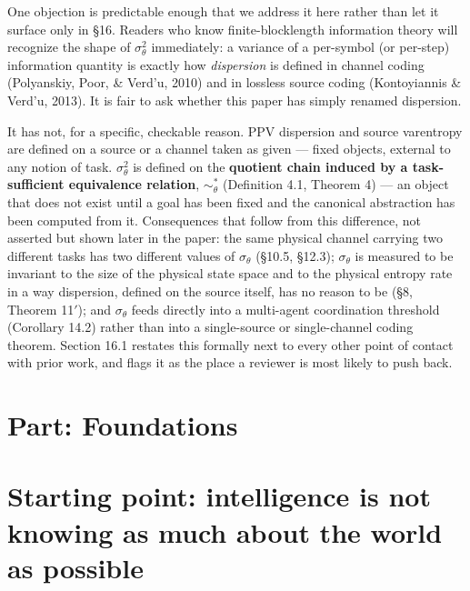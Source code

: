 \documentclass[11pt]{article}
\begin{document}
One objection is predictable enough that we address it here rather than let it surface only in \S{}16. Readers who know finite-blocklength information theory will recognize the shape of \(\sigma_\theta^2\) immediately: a variance of a per-symbol (or per-step) information quantity is exactly how \emph{dispersion} is defined in channel coding (Polyanskiy, Poor, \& Verd'u, 2010) and in lossless source coding (Kontoyiannis \& Verd'u, 2013). It is fair to ask whether this paper has simply renamed dispersion.

It has not, for a specific, checkable reason. PPV dispersion and source varentropy are defined on a source or a channel taken as given --- fixed objects, external to any notion of task. \(\sigma_\theta^2\) is defined on the \textbf{quotient chain induced by a task-sufficient equivalence relation}, \(\sim_\theta^*\) (Definition 4.1, Theorem 4) --- an object that does not exist until a goal has been fixed and the canonical abstraction has been computed from it. Consequences that follow from this difference, not asserted but shown later in the paper: the same physical channel carrying two different tasks has two different values of \(\sigma_\theta\) (\S{}10.5, \S{}12.3); \(\sigma_\theta\) is measured to be invariant to the size of the physical state space and to the physical entropy rate in a way dispersion, defined on the source itself, has no reason to be (\S{}8, Theorem 11\('\)); and \(\sigma_\theta\) feeds directly into a multi-agent coordination threshold (Corollary 14.2) rather than into a single-source or single-channel coding theorem. Section 16.1 restates this formally next to every other point of contact with prior work, and flags it as the place a reviewer is most likely to push back.

\hypertarget{part-foundations}{%
\section*{Part: Foundations}\label{part-foundations}}

\hypertarget{starting-point-intelligence-is-not-knowing-as-much-about-the-world-as-possible}{%
\section{Starting point: intelligence is not knowing as much about the world as possible}\label{starting-point-intelligence-is-not-knowing-as-much-about-the-world-as-possible}}
\end{document}
